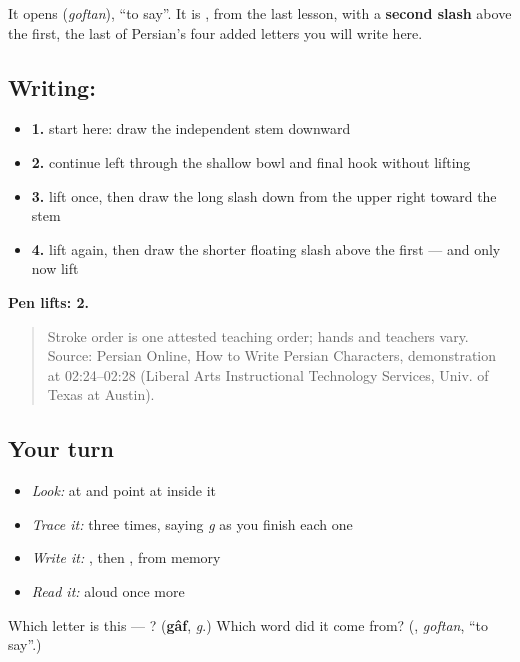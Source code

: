 It opens \textbf{} (\emph{goftan}), \textquotedblleft{}to say\textquotedblright{}. It is \textbf{}, from the last lesson, with a \textbf{second slash} above the first, the last of Persian's four added letters you will write here.

\subsection*{Writing: }

\begin{itemize}
\raggedright
  \item \textbf{1.} start here: draw the independent stem downward
  \item \textbf{2.} continue left through the shallow bowl and final hook without lifting
  \item \textbf{3.} lift once, then draw the long slash down from the upper right toward the stem
  \item \textbf{4.} lift again, then draw the shorter floating slash above the first — and only now lift
\end{itemize}

\textbf{Pen lifts: 2.}

\begin{quote}
Stroke order is one attested teaching order; hands and teachers vary. Source: Persian Online, How to Write Persian Characters,  demonstration at 02:24–02:28 (Liberal Arts Instructional Technology Services, Univ. of Texas at Austin).
\end{quote}

\subsection*{Your turn}
\begin{itemize}
\raggedright
  \item \emph{Look:} at \textbf{} and point at  inside it
  \item \emph{Trace it:}  three times, saying \emph{g} as you finish each one
  \item \emph{Write it:} , then , from memory
  \item \emph{Read it:} \textbf{} aloud once more
\end{itemize}

\begin{tcolorbox}[breakable,colback=teal!4,colframe=teal!35!black,title={Before you move on}]
Which letter is this — ? (\textbf{gâf}, \emph{g}.) Which word did it come from? (\textbf{}, \emph{goftan}, \textquotedblleft{}to say\textquotedblright{}.)
\end{tcolorbox}
